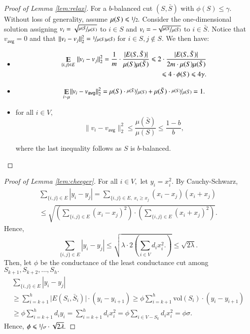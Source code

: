 \documentclass[twoside,leqno,twocolumn]{article}
\newcommand{\nfrac}{\nicefrac}
\renewcommand{\mathbb}{\varmathbb}
\renewcommand{\leq}{\leqslant}
\renewcommand{\geq}{\geqslant}
\newcommand{\abs}[1]{\lvert#1\rvert}
\newcommand{\norm}[1]{\lVert#1\rVert}
\newcommand{\card}{\abs}
\newcommand{\Esymb}{\mathbb{E}}
\DeclareMathOperator*{\E}{\Esymb}
\newcommand{\Vol}[1]{\text{vol}(#1)}
\numberwithin{equation}{section}
\newcommand{\avg}{{\ensuremath{\mathsf{avg}}\xspace}}
\begin{document}
\begin{proof}[Proof of Lemma \ref{lem:relax}]
For a $b$-balanced cut $(S, \bar{S})$ with $\phi(S) \leq \gamma.$ Without loss of generality, assume $\mu(S) \leq \nfrac{1}{2}.$ Consider the one-dimensional solution assigning $v_i = \sqrt{\nfrac{\mu(\bar{S}}{\mu(S)}}$ to $i \in S$ and $v_i = -\sqrt{\nfrac{\mu(S}{\mu(\bar{S})}}$ to $i \in \bar{S}.$ Notice that $v_\avg = 0$ and that $\norm{v_i - v_j}_2^2 = \nfrac{1}{\mu(S) \mu(\bar{S})}$ for $i \in S, j \notin S.$
We then have:
\begin{itemize}
 \item \begin{align*}
	  \E_{\{i,j\} \in E}\;\norm{v_i-v_j}_2^2 = \frac{1}{m} \cdot \frac{|E(S, \bar{S})|}{\mu(S) \mu(\bar{S})}\leq 2 \cdot \frac{|E(S, \bar{S})|}{2m \cdot \mu(S) \mu(\bar{S})} \\
\leq 4 \cdot \phi(S) \leq 4 \gamma.
\end{align*}
\item
$$ 
 \E_{i \sim \mu}\norm{v_i - v_\avg}_2^2 
= \mu(S) \cdot \nfrac{\mu(\bar{S})}{\mu(S)} + \mu(\bar{S}) \cdot \nfrac{\mu(S)}{\mu(\bar{S})}  = 1. 
$$ 
\item for all $i \in V,$ 
$$
 \norm{v_i- v_\avg}_2^2 \leq \frac{\mu(\bar{S})}{\mu(S)} \leq \frac{1-b}{b},
$$

\noindent
where the last inequality follows as $S$ is $b$-balanced.
\end{itemize}
\end{proof}

\begin{proof}[Proof of Lemma \ref{lem:cheeger}]
For all $i \in V,$ let $y_i = x_i^2.$
By Cauchy-Schwarz,
\begin{align*}
\sum_{\{i,j\} \in E} |y_i - y_j| = \sum_{\{i,j\} \in E,\; x_i \geq x_j} (x_i - x_j) (x_i + x_j) \\
\leq \sqrt{\left(\sum_{\{i,j\} \in E} (x_i - x_j)^2 \right) \cdot \left(\sum_{\{i,j\} \in E} (x_i + x_j)^2 \right)}.
\end{align*}
Hence,
$$
\sum_{\{i,j\} \in E} |y_i - y_j| \leq \sqrt{\lambda \cdot 2\left(\sum_{i \in V} d_i x_i^2. \right)} \leq \sqrt{2\lambda}.
$$
Then, let $\phi$ be the conductance of the least conductance cut among $S_{k+1}, S_{k+2}, \ldots, S_h.$
\begin{align*}
\sum_{\{i,j\} \in E} |y_i - y_j| \\
\geq \sum_{i= k+1}^h \card{E(S_i, \bar{S}_i)} \cdot (y_i - y_{i+1}) \geq \phi  \sum_{i= k+1}^h \Vol{S_i} \cdot (y_i - y_{i+1})\\
 \geq \phi \sum_{i= k+1}^h d_i y_i = \sum_{i=k+1}^h d_i x_i^2 = \phi \sum_{i \in V - S_k} d_i x_i^2 = \phi \sigma.
\end{align*}
Hence, $ \phi \leq \nfrac{1}{\sigma} \cdot \sqrt{2\lambda}.$



\end{proof}
\end{document}
